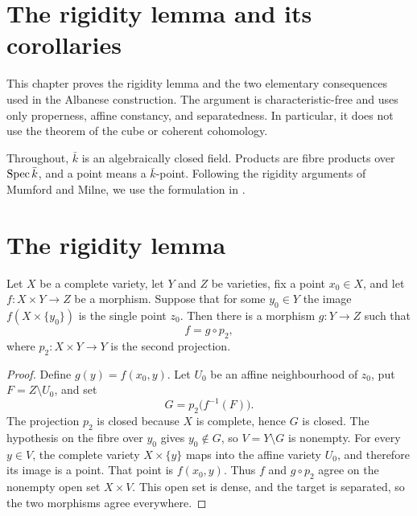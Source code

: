 \section{The rigidity lemma and its corollaries}
\label{mk-chap:AbelianVarietyRigidity}
\label{mk-chap:avr_for_rr}

This chapter proves the rigidity lemma and the two elementary consequences used in the
Albanese construction.  The argument is characteristic-free and uses only properness,
affine constancy, and separatedness.  In particular, it does not use the theorem of the
cube or coherent cohomology.

Throughout, \(\bar k\) is an algebraically closed field.  Products are fibre products over
\(\operatorname{Spec} \bar k\), and a point means a \(\bar k\)-point.
Following the rigidity arguments of Mumford and Milne, we use the formulation in
\cite{mumford-av,milne-av}.

\section{The rigidity lemma}

\begin{lemma}
  \label{mk-thm:rigidity_lemma}
  \leanok

  Let \(X\) be a complete variety, let \(Y\) and \(Z\) be varieties, fix a point
  \(x_0\in X\), and let \(f \colon X \times Y \to Z\) be a morphism.  Suppose that
  for some \(y_0 \in Y\) the image \(f(X \times \{y_0\})\) is the single point
  \(z_0\).  Then there is a morphism \(g \colon Y \to Z\) such that
  \[
    f = g \circ p_2,
  \]
  where \(p_2 \colon X \times Y \to Y\) is the second projection.
\end{lemma}
\begin{proof}
  \leanok
  Define \(g(y)=f(x_0,y)\).  Let \(U_0\) be an affine
  neighbourhood of \(z_0\), put \(F=Z\setminus U_0\), and set
  \[
    G=p_2\bigl(f^{-1}(F)\bigr).
  \]
  The projection \(p_2\) is closed because \(X\) is complete, hence \(G\) is closed.
  The hypothesis on the fibre over \(y_0\) gives \(y_0\notin G\), so
  \(V=Y\setminus G\) is nonempty.  For every \(y\in V\), the complete variety
  \(X\times\{y\}\) maps into the affine variety \(U_0\), and therefore its image is
  a point.  That point is \(f(x_0,y)\).  Thus \(f\) and \(g\circ p_2\) agree on the
  nonempty open set \(X\times V\).  This open set is dense, and the target is
  separated, so the two morphisms agree everywhere.
\end{proof}

